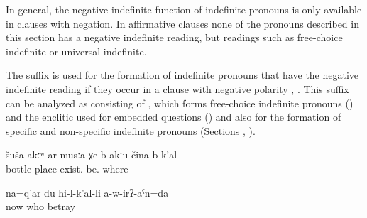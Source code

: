 In general, the negative indefinite function of indefinite pronouns is only available in clauses with negation. In affirmative clauses none of the pronouns described in this section has a negative indefinite reading, but readings such as free-choice indefinite or universal indefinite. 

The suffix  is used for the formation of indefinite pronouns that have the negative indefinite reading if they occur in a clause with negative polarity , . This suffix can be analyzed as consisting of , which forms free-choice indefinite pronouns () and the enclitic used for embedded questions () and also for the formation of specific and non-specific indefinite pronouns (Sections , ).
%
\begin{exe}
	\ex	\label{ex:There is no place where there are no bottles}
	\gll	šuša	akːʷ-ar	musːa	χe-b-akːu	čina-b-k'al\\
		bottle		place	exist.-be.	where\\
	\glt	{}

	\ex	\label{ex:Now nobody will betray me anymore}
	\gll	na=q'ar	du	hi-l-k'al-li	a-w-irʡ-aˁn=da\\
		now		who	betray\\
	\glt	{}
\end{exe}

